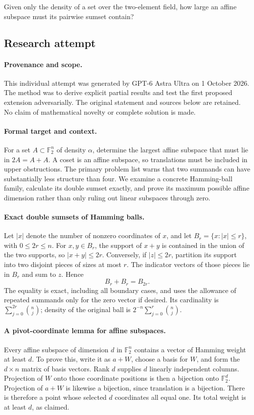 \documentclass[11pt,a4paper]{article}
\newcommand{\F}{\mathbb{F}}
\begin{document}
Given only the density of a set over the two-element field, how large an affine subspace must its pairwise sumset contain?

\subsection{Research attempt}

\paragraph{Provenance and scope.}
This individual attempt was generated by GPT-6 Astra Ultra on 1 October 2026. The method was to derive explicit partial results and test the first proposed extension adversarially. The original statement and sources below are retained. No claim of mathematical novelty or complete solution is made.

\paragraph{Formal target and context.}
For a set $A\subset\F_2^n$ of density $\alpha$, determine the largest affine subspace that must lie in $2A=A+A$. A coset is an affine subspace, so translations must be included in upper obstructions. The primary problem list warns that two summands can have substantially less structure than four. We examine a concrete Hamming-ball family, calculate its double sumset exactly, and prove its maximum possible affine dimension rather than only ruling out linear subspaces through zero.

\paragraph{Exact double sumsets of Hamming balls.}
Let $|x|$ denote the number of nonzero coordinates of $x$, and let $B_r=\{x:|x|\leq r\}$, with $0\leq2r\leq n$. For $x,y\in B_r$, the support of $x+y$ is contained in the union of the two supports, so $|x+y|\leq2r$. Conversely, if $|z|\leq2r$, partition its support into two disjoint pieces of sizes at most $r$. The indicator vectors of those pieces lie in $B_r$ and sum to $z$. Hence
\[
 B_r+B_r=B_{2r}.
\]
The equality is exact, including all boundary cases, and uses the allowance of repeated summands only for the zero vector if desired. Its cardinality is $\sum_{j=0}^{2r}\binom nj$; density of the original ball is $2^{-n}\sum_{j=0}^r\binom nj$.

\paragraph{A pivot-coordinate lemma for affine subspaces.}
Every affine subspace of dimension $d$ in $\F_2^n$ contains a vector of Hamming weight at least $d$. To prove this, write it as $a+W$, choose a basis for $W$, and form the $d\times n$ matrix of basis vectors. Rank $d$ supplies $d$ linearly independent columns. Projection of $W$ onto those coordinate positions is then a bijection onto $\F_2^d$. Projection of $a+W$ is likewise a bijection, since translation is a bijection. There is therefore a point whose selected $d$ coordinates all equal one. Its total weight is at least $d$, as claimed.
\end{document}

